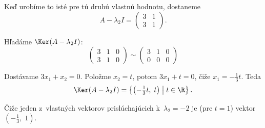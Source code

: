 \begin{priklad}
Keď urobíme to isté pre tú druhú vlastnú hodnotu, dostaneme
\[
  A - \lambda_2 I
  = \begin{pmatrix} 3 & 1 \\ 3 & 1 \end{pmatrix}.
\]

Hľadáme $\Ker(A - \lambda_2 I)$:
\[
  \left(\begin{array}{cc|c}
    3 & 1 & 0 \\
    3 & 1 & 0
  \end{array}\right)
  \sim
  \left(\begin{array}{cc|c}
    3 & 1 & 0 \\
    0 & 0 & 0
  \end{array}\right)
\]

Dostávame $3x_1 + x_2 = 0$. Položme $x_2 = t$, potom $3x_1 + t = 0$, čiže $x_1 = -\frac{1}{3}t$. Teda
\[
  \Ker(A - \lambda_2 I)
  = \left\{\left(-\tfrac{1}{3}t,\; t\right) \;\middle|\; t \in \R\right\}.
\]

Čiže jeden z~vlastných vektorov prislúchajúcich k~$\lambda_2 = -2$ je (pre $t = 1$) vektor $\left(-\frac{1}{3},\; 1\right)$.
\end{priklad}
